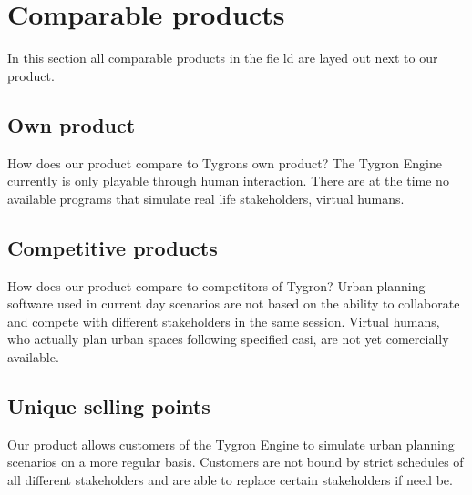 \section{Comparable products}
In this section all comparable products in the fie
ld are layed out next to our product. \newline

\subsection{Own product}
How does our product compare to Tygrons own product?
The Tygron Engine currently is only playable through human interaction. There are at the time no available programs that simulate real life stakeholders, virtual humans. \newline

\subsection{Competitive products}
How does our product compare to competitors of Tygron?
Urban planning software used in current day scenarios are not based on the ability to collaborate and compete with different stakeholders in the same session. Virtual humans, who actually plan urban spaces following specified casi, are not yet comercially available. \newline

\subsection{Unique selling points}
Our product allows customers of the Tygron Engine to simulate urban planning scenarios on a more regular basis. Customers are not bound by strict schedules of all different stakeholders and are able to replace certain stakeholders if need be. \newline
